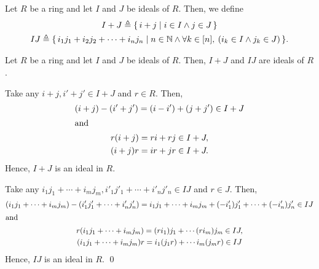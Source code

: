 \documentclass[../modern_algebra.tex]{subfiles}
\begin{document}
\begin{Definition}[colbacktitle=red!75!black]{}{}
    Let \(R\) be a ring and let \(I\) and \(J\) be ideals of \(R\).
    Then, we define
    \begin{gather*}
        I + J \triangleq \{\,i + j \mid i \in I \land j \in J\,\} \\
        IJ \triangleq \{\,i_1j_1 + i_2j_2 + \cdots + i_nj_n \mid n \in \NN \land \fall k \in [n],\: (i_k \in I \land j_k \in J)\,\}.
    \end{gather*}
\end{Definition}

\begin{Lemma}{\textsf{}}{}
    Let \(R\) be a ring and let \(I\) and \(J\) be ideals of \(R\).
    Then, \(I + J\) and \(IJ\) are ideals of \(R\).
\end{Lemma}
\begin{myclaim}[Proof]\hfill
\begin{enumerate}[nolistsep, label=(\roman*), listparindent=\parindent]
    \ii
    Take any \(i + j, i' + j' \in I + J\) and \(r \in R\). Then,
    \begin{gather*}
        (i + j) - (i' + j') = (i - i') + (j + j') \in I + J \\
        \shortintertext{and}
        r(i + j) = ri + rj \in I + J, \\
        (i + j)r = ir + jr \in I + J.
    \end{gather*}
    Hence, \(I + J\) is an ideal in \(R\).

    \ii
    Take any \(i_1j_1 + \cdots + i_mj_m, i'_1j'_1 + \cdots + i'_nj'_n \in IJ\) and \(r \in J\).
    Then,
    \begin{gather*}
        (i_1j_1 + \cdots + i_mj_m) - (i'_1j'_1 + \cdots + i'_nj'_n)
        = i_1j_1 + \cdots + i_mj_m + (-i'_1)j'_1 + \cdots + (-i'_n) j'_n \in IJ \\
        \intertext{and}
        r(i_1j_1 + \cdots + i_mj_m) = (ri_1)j_1 + \cdots (ri_m)j_m \in IJ, \\
        (i_1j_1 + \cdots + i_mj_m)r = i_1(j_1r) + \cdots i_m(j_mr) \in IJ
    \end{gather*}
    Hence, \(IJ\) is an ideal in \(R\).
    \qed
\end{enumerate}
\end{myclaim}
\end{document}
